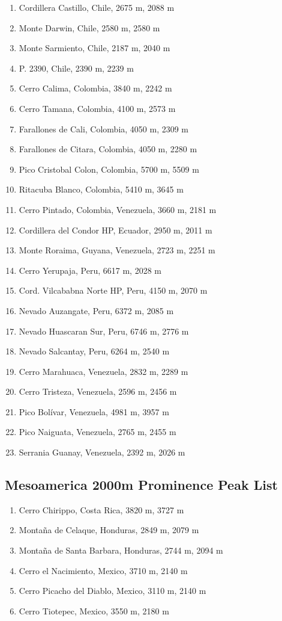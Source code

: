 \documentclass[10pt,twocolumn,letterpaper]{article}
\begin{document}
\begin{flushleft}
\begin{enumerate}
    \item Cordillera Castillo, Chile, 2675 m, 2088 m
    \item Monte Darwin, Chile, 2580 m, 2580 m
    \item Monte Sarmiento, Chile, 2187 m, 2040 m
    \item P. 2390, Chile, 2390 m, 2239 m
    \item Cerro Calima, Colombia, 3840 m, 2242 m
    \item Cerro Tamana, Colombia, 4100 m, 2573 m
    \item Farallones de Cali, Colombia, 4050 m, 2309 m
    \item Farallones de Citara, Colombia, 4050 m, 2280 m
    \item Pico Cristobal Colon, Colombia, 5700 m, 5509 m
    \item Ritacuba Blanco, Colombia, 5410 m, 3645 m
    \item Cerro Pintado, Colombia, Venezuela, 3660 m, 2181 m
    \item Cordillera del Condor HP, Ecuador, 2950 m, 2011 m
    \item Monte Roraima, Guyana, Venezuela, 2723 m, 2251 m
    \item Cerro Yerupaja, Peru, 6617 m, 2028 m
    \item Cord. Vilcababna Norte HP, Peru, 4150 m, 2070 m
    \item Nevado Auzangate, Peru, 6372 m, 2085 m
    \item Nevado Huascaran Sur, Peru, 6746 m, 2776 m
    \item Nevado Salcantay, Peru, 6264 m, 2540 m
    \item Cerro Marahuaca, Venezuela, 2832 m, 2289 m
    \item Cerro Tristeza, Venezuela, 2596 m, 2456 m
    \item Pico Bolívar, Venezuela, 4981 m, 3957 m
    \item Pico Naiguata, Venezuela, 2765 m, 2455 m
    \item Serrania Guanay, Venezuela, 2392 m, 2026 m
\end{enumerate}
\end{flushleft}

\subsection{Mesoamerica 2000m Prominence Peak List}
\begin{flushleft}
\begin{enumerate}
    \item Cerro Chirippo, Costa Rica, 3820 m, 3727 m
    \item Montaña de Celaque, Honduras, 2849 m, 2079 m
    \item Montaña de Santa Barbara, Honduras, 2744 m, 2094 m
    \item Cerro el Nacimiento, Mexico, 3710 m, 2140 m
    \item Cerro Picacho del Diablo, Mexico, 3110 m, 2140 m
    \item Cerro Tiotepec, Mexico, 3550 m, 2180 m
\end{enumerate}
\end{flushleft}
\end{document}
